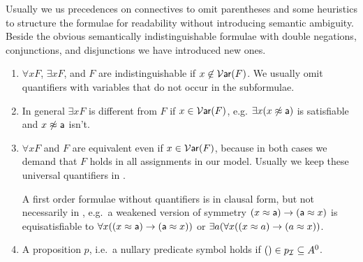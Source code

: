 \begin{remark}Usually we us precedences on connectives to omit parentheses 
	and some heuristics to structure the formulae for readability 
	without introducing semantic ambiguity.
%
	Beside the obvious semantically indistinguishable formulae with double negations, conjunctions, and disjunctions 
	we have introduced new ones.
	\begin{enumerate}
		\item $\forall x F$, $\exists x F$, and $F$ are indistinguishable if $x\not\in\operatorname{\mathcal{V}\mathsf{ar}}(F)$. 
		We usually omit quantifiers with variables that do not occur in the subformulae.
		\item In general $\exists x F$ is different from $F$ if $x\in\operatorname{\mathcal{V}\mathsf{ar}}(F)$, e.g. $\exists x(x\not\approx{\mathsf a})$ is satisfiable and $x\not\approx{\mathsf a}$ isn't.
		\item $\forall x F$ and $F$ are equivalent even if $x\in\operatorname{\mathcal{V}\mathsf{ar}}(F)$, 
		because in both cases we demand that $F$ holds in all assignments in our model.
		Usually we keep these universal quantifiers in \FOF.
		
		A first order formulae without quantifiers is in {\myem clausal form}, 
		but not necessarily in \CNF, e.g.~a weakened version of symmetry $(x\approx {\mathsf a})\rightarrow ({\mathsf a}\approx x)$ 
		is equisatisfiable to $\forall x ((x\approx {\mathsf a})\rightarrow ({\mathsf a}\approx x))$ 
		or $\exists a (\forall x ((x\approx a)\rightarrow (a\approx x))$. 
		\item A proposition $p$, i.e.~a nullary predicate symbol holds if $()\in p_{\mathcal I} \subseteq A^0$.
	\end{enumerate}

\end{remark}